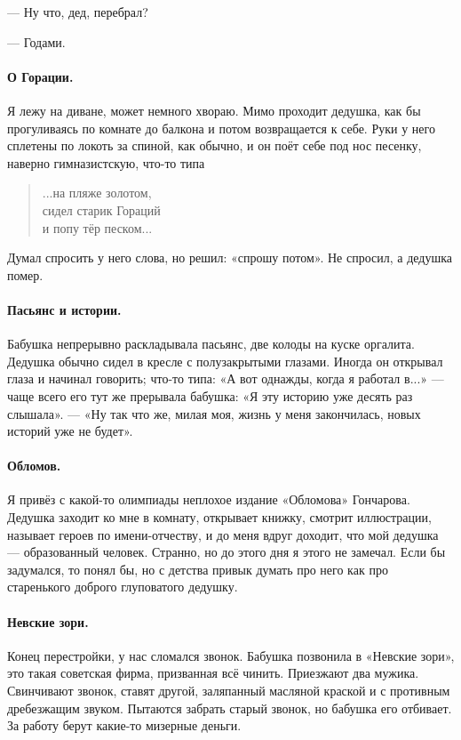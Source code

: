 \documentclass{book}
\begin{document}
--- Ну что, дед, перебрал?

--- Годами.

\paragraph{О Горации.}
Я лежу на диване, может немного хвораю.
Мимо проходит дедушка, как бы прогуливаясь по комнате до балкона и потом возвращается к себе.
Руки у него сплетены по локоть за спиной, как обычно, и
он поёт себе под нос песенку, наверно гимназистскую, что-то типа 
\begin{verse}
...на пляже золотом,\\
сидел старик Гораций\\
и попу тёр песком...
\end{verse}
Думал спросить у него слова, но решил: «спрошу потом».
Не спросил, а дедушка помер.

\paragraph{Пасьянс и истории.}
Бабушка непрерывно раскладывала пасьянс, две колоды на куске оргалита.
Дедушка обычно сидел в кресле с полузакрытыми глазами.
Иногда он открывал глаза и начинал говорить;
что-то типа: «А вот однажды, когда я работал в...» --- чаще всего его тут же прерывала бабушка: «Я эту историю уже десять раз слышала». --- «Ну так что же, милая моя, жизнь у меня закончилась, новых историй уже не будет».

\paragraph{Обломов.}
Я привёз с какой-то олимпиады неплохое издание «Обломова» Гончарова.
Дедушка заходит ко мне в комнату, открывает книжку, смотрит иллюстрации, называет героев по имени-отчеству, и до меня вдруг доходит, что мой дедушка --- образованный человек.
Странно, но до этого дня я этого не замечал.
Если бы задумался, то понял бы, но с детства привык думать про него как про старенького доброго глуповатого дедушку.

\paragraph{Невские зори.}
Конец перестройки, у нас сломался звонок.
Бабушка позвонила в «Невские зори», это такая советская фирма, призванная всё чинить.
Приезжают два мужика.
Свинчивают звонок, ставят другой, заляпанный масляной краской и с противным дребезжащим звуком.
Пытаются забрать старый звонок, но бабушка его отбивает.
За работу берут какие-то мизерные деньги.
\end{document}
